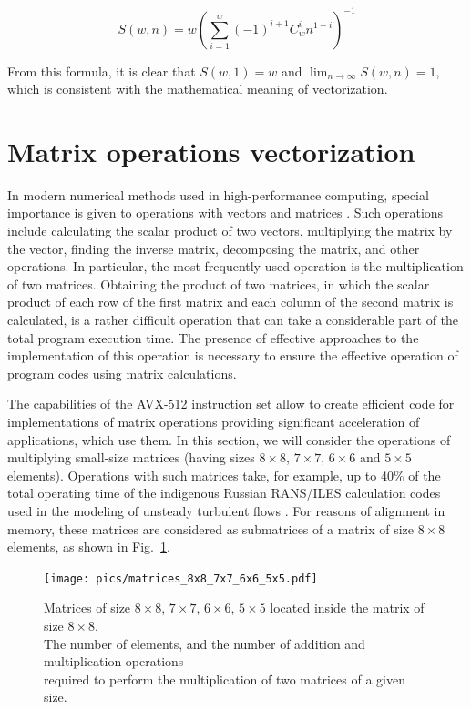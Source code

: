 \documentclass[
11pt,%
tightenlines,%
twoside,%
onecolumn,%
nofloats,%
nobibnotes,%
nofootinbib,%
superscriptaddress,%
noshowpacs,%
centertags]%
{revtex4}
\begin{document}
\begin{equation}
S(w, n) = w \left( \sum_{i = 1}^{w}{(-1)^{i + 1} C_{w}^{i} n^{1 - i}} \right)^{-1}
\end{equation}

From this formula, it is clear that $S(w, 1) = w$ and $\lim_{n \to \infty}{S(w, n)} = 1$, which is consistent with the mathematical meaning of vectorization.

\section{Matrix operations vectorization}

In modern numerical methods used in high-performance computing, special importance is given to operations with vectors and matrices \cite{Golub,Zhang}.
Such operations include calculating the scalar product of two vectors, multiplying the matrix by the vector, finding the inverse matrix, decomposing the matrix, and other operations.
In particular, the most frequently used operation is the multiplication of two matrices.
Obtaining the product of two matrices, in which the scalar product of each row of the first matrix and each column of the second matrix is calculated, is a rather difficult operation that can take a considerable part of the total program execution time.
The presence of effective approaches to the implementation of this operation is necessary to ensure the effective operation of program codes using matrix calculations.

The capabilities of the AVX-512 instruction set allow to create efficient code for implementations of matrix operations providing significant acceleration of  applications, which use them.
In this section, we will consider the operations of multiplying small-size matrices (having sizes $8 \times 8$, $7 \times 7$, $6 \times 6$ and $5 \times 5$ elements).
Operations with such matrices take, for example, up to 40\% of the total operating time of the indigenous Russian RANS/ILES calculation codes used in the modeling of unsteady turbulent flows \cite{Lyub_RANS_ILES, Ben_Lyub_Chest_RANS_ILES}.
For reasons of alignment in memory, these matrices are considered as submatrices of a matrix of size $8 \times 8$ elements, as shown in Fig.~\ref{fig:matrices_8x8_7x7_6x6_5x5}.

\begin{figure}[h]
\setcaptionmargin{5mm}
\onelinecaptionsfalse %
\texttt{[image: pics/matrices\_8x8\_7x7\_6x6\_5x5.pdf]}
\caption{Matrices of size $8 \times 8$, $7 \times 7$, $6 \times 6$, $5 \times 5$ located inside the matrix of size $8 \times 8$. \\ The number of elements, and the number of addition and multiplication operations \\ required to perform the multiplication of two matrices of a given size.}\label{fig:matrices_8x8_7x7_6x6_5x5}
\end{figure}
\end{document}
